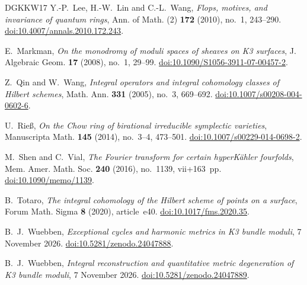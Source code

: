 \begin{thebibliography}{DGKKW17}
Y.-P.~Lee, H.-W.~Lin and C.-L.~Wang,
\emph{Flops, motives, and invariance of quantum rings},
Ann. of Math. (2) \textbf{172} (2010), no.~1, 243--290.
\href{https://doi.org/10.4007/annals.2010.172.243}{doi:10.4007/annals.2010.172.243}.

E.~Markman,
\emph{On the monodromy of moduli spaces of sheaves on K3 surfaces},
J. Algebraic Geom. \textbf{17} (2008), no.~1, 29--99.
\href{https://doi.org/10.1090/S1056-3911-07-00457-2}{doi:10.1090/S1056-3911-07-00457-2}.

Z.~Qin and W.~Wang,
\emph{Integral operators and integral cohomology classes of Hilbert schemes},
Math. Ann. \textbf{331} (2005), no.~3, 669--692.
\href{https://doi.org/10.1007/s00208-004-0602-6}{doi:10.1007/s00208-004-0602-6}.

U.~Rie\ss,
\emph{On the Chow ring of birational irreducible symplectic varieties},
Manuscripta Math. \textbf{145} (2014), no.~3--4, 473--501.
\href{https://doi.org/10.1007/s00229-014-0698-2}{doi:10.1007/s00229-014-0698-2}.

M.~Shen and C.~Vial,
\emph{The Fourier transform for certain hyperK\"ahler fourfolds},
Mem. Amer. Math. Soc. \textbf{240} (2016), no.~1139, vii+163~pp.
\href{https://doi.org/10.1090/memo/1139}{doi:10.1090/memo/1139}.

B.~Totaro,
\emph{The integral cohomology of the Hilbert scheme of points on a surface},
Forum Math. Sigma \textbf{8} (2020), article~e40.
\href{https://doi.org/10.1017/fms.2020.35}{doi:10.1017/fms.2020.35}.

B.~J.~Wuebben,
\emph{Exceptional cycles and harmonic metrics in K3 bundle moduli},
7 November 2026.
\href{https://doi.org/10.5281/zenodo.24047888}{doi:10.5281/zenodo.24047888}.

B.~J.~Wuebben,
\emph{Integral reconstruction and quantitative metric degeneration of K3 bundle moduli},
7 November 2026.
\href{https://doi.org/10.5281/zenodo.24047889}{doi:10.5281/zenodo.24047889}.

\end{thebibliography}
